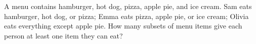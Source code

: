A menu contains hamburger, hot dog, pizza, apple pie, and ice cream. Sam eats hamburger, hot dog, or pizza; Emma eats pizza, apple pie, or ice cream; Olivia eats everything except apple pie. How many subsets of menu items give each person at least one item they can eat?
